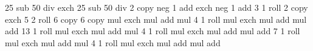 {\pgfpointorigin}
{\pgfpoint{100bp}{100bp}}
{
}{
  25 sub 50 div exch 25 sub 50 div 2 copy                   %
  neg 1 add exch neg 1 add                      %
  3 1 roll 2 copy exch 5 2 roll 6 copy 6 copy   %
  \pgf@lib@shadings@llred mul exch \pgf@lib@shadings@lrred mul add mul     %
  4 1 roll
  \pgf@lib@shadings@urred mul exch \pgf@lib@shadings@ulred mul add mul
  add
  13 1 roll
  \pgf@lib@shadings@llgreen mul exch \pgf@lib@shadings@lrgreen mul add mul %
  4 1 roll
  \pgf@lib@shadings@urgreen mul exch \pgf@lib@shadings@ulgreen mul add mul
  add
  7 1 roll
  \pgf@lib@shadings@llblue mul exch \pgf@lib@shadings@lrblue mul add mul   %
  4 1 roll
  \pgf@lib@shadings@urblue mul exch \pgf@lib@shadings@ulblue mul add mul
  add
}


%
%

